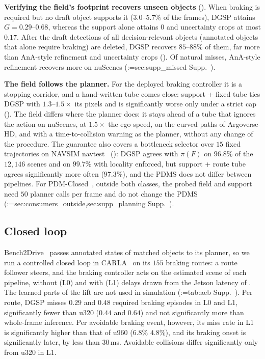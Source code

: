 \documentclass[10pt,twocolumn,letterpaper]{article}
\makeatletter
\newcommand{\method}{DGSP\xspace}
\newcommand{\full}{F}             %
\newcommand{\policy}{\pi}         %
\newcommand{\G}{G}                %
\theoremstyle{definition}
\theoremstyle{remark}
\DeclareRobustCommand{\supp}[1]{\def\supp@list{}\@for\supp@i:=#1\do{\ifx\supp@list\@empty\edef\supp@list{S-\supp@i}\else\edef\supp@list{\supp@list,S-\supp@i}\fi}%
\edef\supp@cmd{\noexpand\Cref*{\supp@list}}Supp.~\supp@cmd}
\makeatother
\begin{document}
\noindent\textbf{Verifying the field's footprint recovers unseen objects} ().
When braking is required but no draft object supports it ($3.0$--$5.7\%$ of the frames), \method attains $\G=0.29$--$0.68$, whereas the support alone attains $0$ and uncertainty crops at most $0.17$.
After the draft detections of all decision-relevant objects (annotated objects that alone require braking) are deleted, \method recovers $85$--$88\%$ of them, far more than AnA-style refinement and uncertainty crops ().
Of natural misses, AnA-style refinement recovers more on nuScenes (\supp{sec:supp_missed}).

\noindent\textbf{The field follows the planner.}
For the deployed braking controller it is a stopping corridor, and a hand-written tube comes close: support + fixed tube ties \method with $1.3$--$1.5\times$ its pixels and is significantly worse only under a strict cap ().
The field differs where the planner does: it stays ahead of a tube that ignores the action on nuScenes, at $1.5\times$ the ego speed, on the curved paths of Argoverse-HD, and with a time-to-collision warning as the planner, without any change of the procedure.
The guarantee also covers a bottleneck selector over $15$ fixed trajectories on NAVSIM navtest~\cite{navsim} (): \method agrees with $\policy(\full)$ on $96.8\%$ of the $12{,}146$ scenes and on $99.7\%$ with locality enforced, but support + route tube agrees significantly more often ($97.3\%$), and the PDMS does not differ between pipelines.
For PDM-Closed~\cite{pdm}, outside both classes, the probed field and support need $50$ planner calls per frame and do not change the PDMS (\supp{sec:consumers_outside,sec:supp_planning}).

\subsection{Closed loop}
\label{sec:exp_planning}

Bench2Drive~\cite{bench2drive} passes annotated states of matched objects to its planner, so we run a controlled closed loop in CARLA~\cite{carla} on its $155$ braking routes: a route follower steers, and the braking controller acts on the estimated scene of each pipeline, without (L0) and with (L1) delays drawn from the Jetson latency of .
The learned parts of the lift are not used in simulation (\supp{tab:aeb}).
Per route, \method misses $0.29$ and $0.48$ required braking episodes in L0 and L1, significantly fewer than u320 ($0.44$ and $0.64$) and not significantly more than whole-frame inference.
Per avoidable braking event, however, its miss rate in L1 is significantly higher than that of u960 ($6.8\%$ \vs $4.8\%$), and its braking onset is significantly later, by less than $30$\,ms.
Avoidable collisions differ significantly only from u320 in L1.
\end{document}
